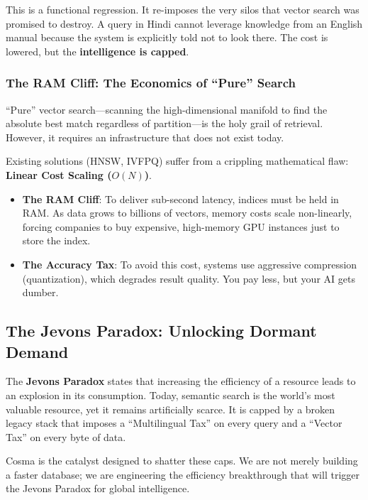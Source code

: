 This is a functional regression. It re-imposes the very silos that vector search was promised to destroy. A query in Hindi cannot leverage knowledge from an English manual because the system is explicitly told not to look there. The cost is lowered, but the \textbf{intelligence is capped}.


\subsubsection{The RAM Cliff: The Economics of ``Pure'' Search}

``Pure'' vector search—scanning the high-dimensional manifold to find the absolute best match regardless of partition—is the holy grail of retrieval. However, it requires an infrastructure that does not exist today.

Existing solutions (HNSW, IVFPQ) suffer from a crippling mathematical flaw: \textbf{Linear Cost Scaling ($O(N)$)}.
\begin{itemize}
    \item \textbf{The RAM Cliff}: To deliver sub-second latency, indices must be held in RAM. As data grows to billions of vectors, memory costs scale non-linearly, forcing companies to buy expensive, high-memory GPU instances just to store the index.
    \item \textbf{The Accuracy Tax}: To avoid this cost, systems use aggressive compression (quantization), which degrades result quality. You pay less, but your AI gets dumber.
\end{itemize}

\subsection{The Jevons Paradox: Unlocking Dormant Demand}

The \textbf{Jevons Paradox} states that increasing the efficiency of a resource leads to an explosion in its consumption. Today, semantic search is the world's most valuable resource, yet it remains artificially scarce. It is capped by a broken legacy stack that imposes a ``Multilingual Tax'' on every query and a ``Vector Tax'' on every byte of data.

Cosma is the catalyst designed to shatter these caps. We are not merely building a faster database; we are engineering the efficiency breakthrough that will trigger the Jevons Paradox for global intelligence.

